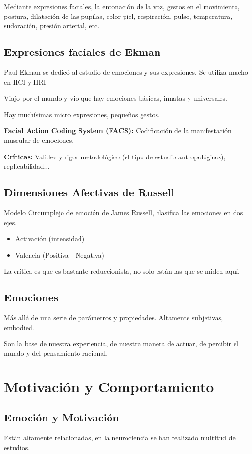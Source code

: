 \documentclass[12pt]{report} %
\begin{document}
Mediante expresiones faciales, la entonación de la voz, gestos en el movimiento, postura, dilatación de las pupilas, color piel, respiración, pulso, temperatura, sudoración, presión arterial, etc.

\subsection{Expresiones faciales de Ekman}
Paul Ekman se dedicó al estudio de emociones y sus expresiones. Se utiliza mucho en HCI y HRI.

Viajo por el mundo y vio que hay emociones básicas, innatas y universales.
  
Hay muchísimas micro expresiones, pequeños gestos.
  
\textbf{Facial Action Coding System (FACS):} Codificación de la manifestación muscular de emociones.
  
\textbf{Críticas:} Validez y rigor metodológico (el tipo de estudio antropológicos), replicabilidad...
  
\subsection{Dimensiones Afectivas de Russell}
Modelo Circumplejo de emoción de James Russell, clasifica las emociones en dos ejes.
\begin{itemize}
  \item Activación (intensidad)
  \item Valencia (Positiva - Negativa)
\end{itemize}
La crítica es que es bastante reduccionista, no solo están las que se miden aquí.

\subsection{Emociones}
Más allá de una serie de parámetros y propiedades. Altamente subjetivas, embodied.

Son la base de nuestra experiencia, de nuestra manera de actuar, de percibir el mundo y del pensamiento racional.

\section{Motivación y Comportamiento}
\subsection{Emoción y Motivación}
Están altamente relacionadas, en la neurociencia se han realizado multitud de estudios.
\end{document}
